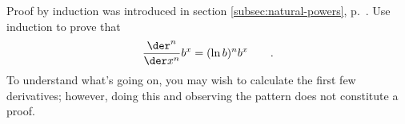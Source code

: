 Proof by induction was introduced in section \ref{subsec:natural-powers}, p.~\pageref{induction}.
Use induction to prove that
\begin{equation*}
  \frac{\der^n}{\der x^n} b^x = (\ln b)^n b^x \qquad .
\end{equation*}
To understand what's going on, you may wish to calculate the first few derivatives; however,
doing this and observing the pattern does not constitute a proof.
